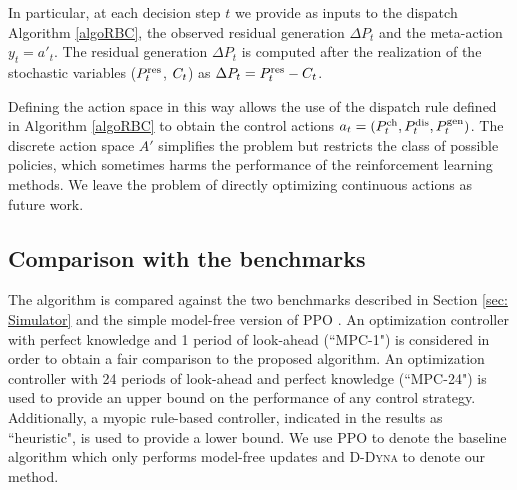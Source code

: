 \documentclass{article}
\begin{document}
		

	In particular, at each decision step $t$ we provide as inputs to the dispatch Algorithm \ref{algoRBC}, the observed residual generation $\Delta P_t$ and the meta-action $y_t=a'_t$. The residual generation $\Delta P_t$ is computed after the realization of the stochastic variables ($P^\text{res}_t$, $C_{t}$) as $\Delta P_t = P^\text{res}_t - C_{t}$.

    Defining the action space in this way allows the use of the dispatch rule defined in Algorithm \ref{algoRBC} to obtain the control actions $a_t = (P^{\text{ch}}_{t}, P^{\text{dis}}_{t}, P^\text{gen}_{t})$. The discrete action space $A'$ simplifies the problem but restricts the class of possible policies, which sometimes harms the performance of the reinforcement learning methods.	We leave the problem of directly optimizing continuous actions as future work.
	

	


\subsection{Comparison with the benchmarks}

The algorithm is compared against the two benchmarks described in Section \ref{sec: Simulator} and the simple model-free version of PPO \cite{Schulman2017}. An optimization controller with perfect knowledge and 1 period of look-ahead (``MPC-1") is considered in order to obtain a fair comparison to the proposed algorithm. An optimization controller with 24 periods of look-ahead and perfect knowledge (``MPC-24") is used to provide an upper bound on the performance of any control strategy. Additionally, a myopic rule-based controller, indicated in the results as ``heuristic", is used to provide a lower bound. We use PPO to denote the baseline algorithm which only performs model-free updates and \textsc{D-Dyna} to denote our method.
\end{document}
